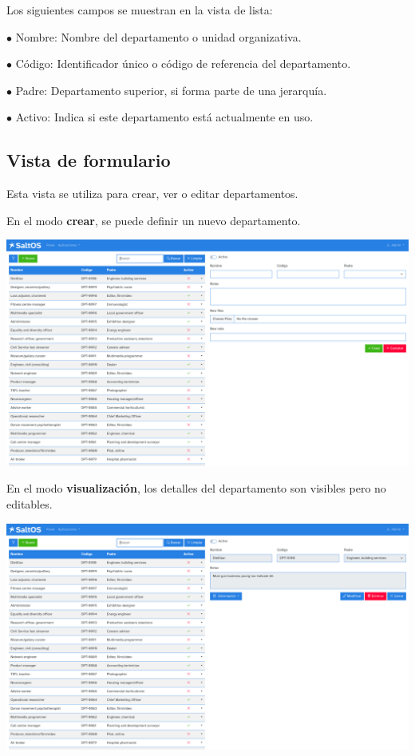 \documentclass[a4paper]{article}
\begin{document}
Los siguientes campos se muestran en la vista de lista:

\begin{compactitem}
\item[\color{myblue}$\bullet$] Nombre: Nombre del departamento o unidad organizativa.
\item[\color{myblue}$\bullet$] Código: Identificador único o código de referencia del departamento.
\item[\color{myblue}$\bullet$] Padre: Departamento superior, si forma parte de una jerarquía.
\item[\color{myblue}$\bullet$] Activo: Indica si este departamento está actualmente en uso.
\end{compactitem}

\hypertarget{toc104}{}
\subsection{Vista de formulario}

Esta vista se utiliza para crear, ver o editar departamentos.

En el modo \textbf{crear}, se puede definir un nuevo departamento.

\begin{center}\includegraphics[width=1\textwidth]{../ujest/snaps/test-screenshots-js-screenshots-hr-departments-create-es-es-1-snap.png}\end{center}

En el modo \textbf{visualización}, los detalles del departamento son visibles pero no editables.

\begin{center}\includegraphics[width=1\textwidth]{../ujest/snaps/test-screenshots-js-screenshots-hr-departments-view-100-es-es-1-snap.png}\end{center}
\end{document}
